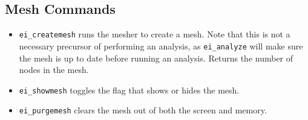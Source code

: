 \subsection{Mesh Commands}

\begin{itemize}
\item \texttt{ei\_createmesh} runs the mesher to create a mesh. Note that this is not
a necessary precursor of performing an analysis, as
\texttt{ei\_analyze} will make sure the mesh is up to date before
running an analysis. Returns the number of nodes in the mesh.

\item \texttt{ei\_showmesh} toggles the flag that shows or hides the mesh.

\item \texttt{ei\_purgemesh} clears the mesh out of both the screen and memory.
\end{itemize}

